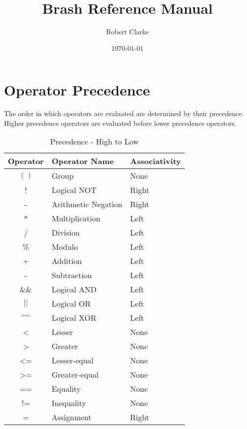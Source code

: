 \documentclass{article}
\title{Brash Reference Manual}
\author{Robert Clarke}
\date{\today}
\begin{document}
\maketitle
\tableofcontents
\clearpage

\section{Operator Precedence}
The order in which operators are evaluated are determined by their precedence.
Higher precedence operators are evaluated before lower precedence operators.

\begin{table}[!ht]
\begin{center}
	\caption{Precedence - High to Low}
\begin{tabular}{|c|l|l|}
	\hline
	Operator & Operator Name & Associativity \\
	\hline
	$( )$              & Group               & None  \\
	!                  & Logical NOT         & Right \\
	-                  & Arithmetic Negation & Right \\

	*                  & Multiplication      & Left \\
	/                  & Division            & Left \\
	\%                 & Modulo              & Left \\

	+                  & Addition            & Left \\
	-                  & Subtraction         & Left \\

	\&\&               & Logical AND         & Left \\
	$||$               & Logical OR          & Left \\
	\^{}\^{}           & Logical XOR         & Left \\

	\textless          & Lesser              & None \\
	\textgreater       & Greater             & None \\
	\textless=         & Lesser-equal        & None \\
	\textgreater=      & Greater-equal       & None \\

	==                 & Equality            & None \\
	!=                 & Inequality          & None \\

	=                  & Assignment          & Right \\
	\hline
\end{tabular}
\end{center}
\end{table}
\end{document}
